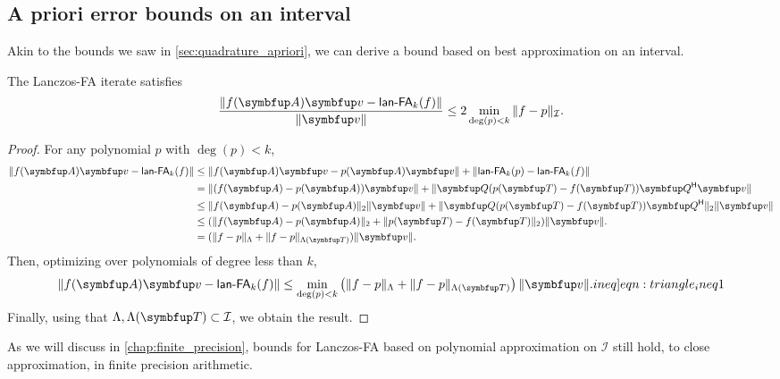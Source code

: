 \subsection{A priori error bounds on an interval}

Akin to the bounds we saw in \cref{sec:quadrature_apriori}, we can derive a bound based on best approximation on an interval.
\begin{theorem}
\label{thm:poly_unif}
    The Lanczos-FA iterate satisfies
\begin{equation*}
    \frac{\| \fA \vec{v} - \lan_k(f) \|}{\|\vec{v}\|}
    \leq  2 \min_{\deg(p)<k} \| f-p \|_{\mathcal{I}} .
\end{equation*}   
\end{theorem}
\begin{proof}
For any polynomial \( p \) with \( \deg(p) < k \),
\begin{align*}
\| \fA \vec{v} - \lan_k(f) \|
& \leq \| \fA \vec{v} - \pA \vec{v} \| + \| \lan_k (p) - \lan_k (f) \| 
\\& = \| (\fA - \pA )\vec{v} \| + \| \vec{Q} ( p\mf{\vec{T}} - f\mf{\vec{T}} ) \vec{Q}^{\cT} \vec{v} \| 
\\& \le \| \fA - \pA \|_2  \| \vec{v} \| + \| \vec{Q} ( p\mf{\vec{T}} - f\mf{\vec{T}} ) \vec{Q}^{\cT} \|_2  \|\vec{v} \|
\\& \le ( \| \fA - \pA \|_2 + \| p(\vec{T} ) - f\mf{\vec{T}} \|_2 )  \| \vec{v} \| . 
    \\& = ( \| f-p \|_{\Lambda} + \| f-p \|_{\Lambda\mf{\vec{T}}} )  \| \vec{v} \| . 
\end{align*}
Then, optimizing over polynomials of degree less than \( k \),
\begin{equation}
\| \fA \vec{v} - \lan_k(f) \|
    \leq \min_{\deg(p)< k} \left( \| f-p \|_{\Lambda} + \| f - p \|_{\Lambda\mf{\vec{T}}} \right) \| \vec{v} \|. \label[ineq]{eqn:triangle_ineq1}
\end{equation}
Finally, using that \( \Lambda,\Lambda\mf{\vec{T}} \subset \mathcal{I} \), we obtain the result.
\end{proof}

As we will discuss in \cref{chap:finite_precision}, bounds for Lanczos-FA based on polynomial approximation on \( \mathcal{I} \) still hold, to close approximation, in finite precision arithmetic.



